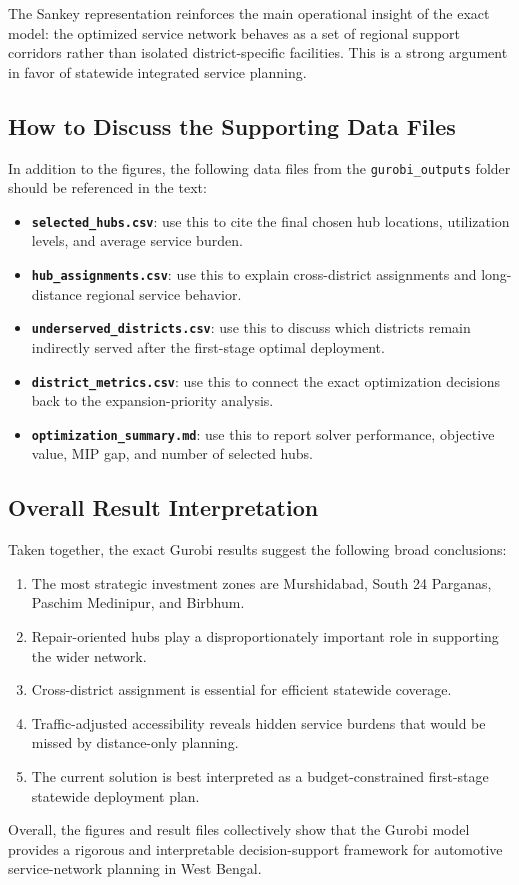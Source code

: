 The Sankey representation reinforces the main operational insight of the exact model: the optimized service network behaves as a set of regional support corridors rather than isolated district-specific facilities. This is a strong argument in favor of statewide integrated service planning.

\subsection{How to Discuss the Supporting Data Files}

In addition to the figures, the following data files from the \texttt{gurobi\_outputs} folder should be referenced in the text:
\begin{itemize}
    \item \textbf{\texttt{selected\_hubs.csv}}: use this to cite the final chosen hub locations, utilization levels, and average service burden.
    \item \textbf{\texttt{hub\_assignments.csv}}: use this to explain cross-district assignments and long-distance regional service behavior.
    \item \textbf{\texttt{underserved\_districts.csv}}: use this to discuss which districts remain indirectly served after the first-stage optimal deployment.
    \item \textbf{\texttt{district\_metrics.csv}}: use this to connect the exact optimization decisions back to the expansion-priority analysis.
    \item \textbf{\texttt{optimization\_summary.md}}: use this to report solver performance, objective value, MIP gap, and number of selected hubs.
\end{itemize}

\subsection{Overall Result Interpretation}

Taken together, the exact Gurobi results suggest the following broad conclusions:
\begin{enumerate}
    \item The most strategic investment zones are Murshidabad, South 24 Parganas, Paschim Medinipur, and Birbhum.
    \item Repair-oriented hubs play a disproportionately important role in supporting the wider network.
    \item Cross-district assignment is essential for efficient statewide coverage.
    \item Traffic-adjusted accessibility reveals hidden service burdens that would be missed by distance-only planning.
    \item The current solution is best interpreted as a budget-constrained first-stage statewide deployment plan.
\end{enumerate}

Overall, the figures and result files collectively show that the Gurobi model provides a rigorous and interpretable decision-support framework for automotive service-network planning in West Bengal.
